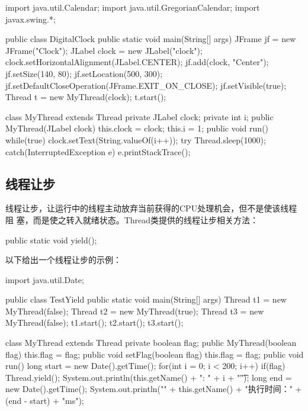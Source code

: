 \begin{javaCode}
import java.util.Calendar;
import java.util.GregorianCalendar;
import javax.swing.*;

public class DigitalClock {
  public static void main(String[] args) {
    JFrame jf = new JFrame("Clock");
    JLabel clock = new JLabel("clock");
    clock.setHorizontalAlignment(JLabel.CENTER);
    jf.add(clock, "Center");
    jf.setSize(140, 80);
    jf.setLocation(500, 300);
    jf.setDefaultCloseOperation(JFrame.EXIT_ON_CLOSE);
    jf.setVisible(true);
    Thread t = new MyThread(clock);
    t.start();
  }
}

class MyThread extends Thread {
  private JLabel clock;
  private int i;
  public MyThread(JLabel clock) {
    this.clock = clock;
    this.i = 1;
  }
  public void run() {
    while(true) {
      clock.setText(String.valueOf(i++));
      try {
        Thread.sleep(1000);
      } catch(InterruptedException e) {
        e.printStackTrace();
      }
    }
  }
}  
\end{javaCode}

\subsection{线程让步}

线程让步，让运行中的线程主动放弃当前获得的CPU处理机会，但不是使该线程阻
塞，而是使之转入就绪状态。Thread类提供的线程让步相关方法：

\begin{javaCode}
public static void yield();
\end{javaCode}

以下给出一个线程让步的示例：


\begin{javaCode}
import java.util.Date;

public class TestYield {
  public static void main(String[] args) {
    Thread t1 = new MyThread(false);
    Thread t2 = new MyThread(true);
    Thread t3 = new MyThread(false);
    t1.start();
    t2.start();
    t3.start();
  }
}

class MyThread extends Thread {
  private boolean flag;
  public MyThread(boolean flag) {
    this.flag = flag;
  }
  public void setFlag(boolean flag) {
    this.flag = flag;
  }
  public void run() {
    long start = new Date().getTime();
    for(int i = 0; i < 200; i++) {
      if(flag) {
        Thread.yield();
      }
      System.out.println(this.getName() + ": " + i + "\t");
    }
    long end = new Date().getTime();
    System.out.println("\n" + this.getName() + "执行时间：" + (end - start) + "ms");
  }
}
\end{javaCode}

